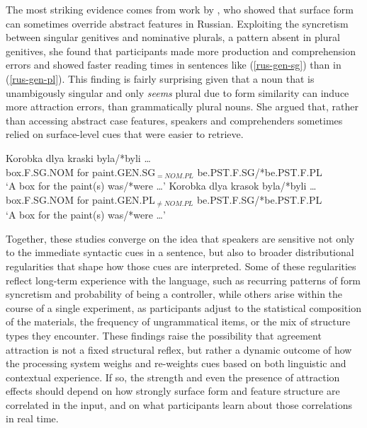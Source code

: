 \documentclass[
  authoryear,
  preprint]{elsarticle}
\begin{document}
The most striking evidence comes from work by \citet{Slioussar2018}, who
showed that surface form can sometimes override abstract features in
Russian. Exploiting the syncretism between singular genitives and
nominative plurals, a pattern absent in plural genitives, she found that
participants made more production and comprehension errors and showed
faster reading times in sentences like (\ref{rus-gen-sg}) than in
(\ref{rus-gen-pl}). This finding is fairly surprising given that a noun
that is unambigously singular and only \emph{seems} plural due to form
similarity can induce more attraction errors, than grammatically plural
nouns. She argued that, rather than accessing abstract case features,
speakers and comprehenders sometimes relied on surface-level cues that
were easier to retrieve.

\begin{exe}
\ex \label{rus}
\begin{xlist}
\ex \label{rus-gen-sg}
\gll Korobka dlya kraski byla/*byli \ldots \\
box.F.SG.NOM for paint.GEN.SG$_{=NOM.PL}$ be.PST.F.SG/*be.PST.F.PL \\
\glt `A box for the paint(s) was/*were \dots'
\ex \label{rus-gen-pl}
\gll Korobka dlya krasok byla/*byli \ldots \\
box.F.SG.NOM for paint.GEN.PL$_{\neq NOM.PL}$ be.PST.F.SG/*be.PST.F.PL \\
\glt `A box for the paint(s) was/*were \dots'
\end{xlist}
\end{exe}

Together, these studies converge on the idea that speakers are sensitive
not only to the immediate syntactic cues in a sentence, but also to
broader distributional regularities that shape how those cues are
interpreted. Some of these regularities reflect long-term experience
with the language, such as recurring patterns of form syncretism and
probability of being a controller, while others arise within the course
of a single experiment, as participants adjust to the statistical
composition of the materials, the frequency of ungrammatical items, or
the mix of structure types they encounter. These findings raise the
possibility that agreement attraction is not a fixed structural reflex,
but rather a dynamic outcome of how the processing system weighs and
re-weights cues based on both linguistic and contextual experience. If
so, the strength and even the presence of attraction effects should
depend on how strongly surface form and feature structure are correlated
in the input, and on what participants learn about those correlations in
real time.
\end{document}
